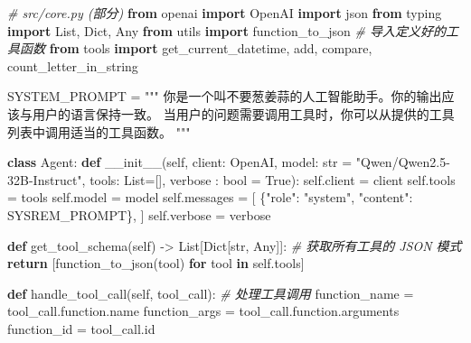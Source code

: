 \documentclass[
]{article}
\newenvironment{Shaded}{}{}
\newcommand{\BuiltInTok}[1]{\textcolor[rgb]{0.00,0.50,0.00}{#1}}
\newcommand{\CommentTok}[1]{\textcolor[rgb]{0.38,0.63,0.69}{\textit{#1}}}
\newcommand{\ControlFlowTok}[1]{\textcolor[rgb]{0.00,0.44,0.13}{\textbf{#1}}}
\newcommand{\FunctionTok}[1]{\textcolor[rgb]{0.02,0.16,0.49}{#1}}
\newcommand{\ImportTok}[1]{\textcolor[rgb]{0.00,0.50,0.00}{\textbf{#1}}}
\newcommand{\KeywordTok}[1]{\textcolor[rgb]{0.00,0.44,0.13}{\textbf{#1}}}
\newcommand{\NormalTok}[1]{#1}
\newcommand{\OperatorTok}[1]{\textcolor[rgb]{0.40,0.40,0.40}{#1}}
\newcommand{\StringTok}[1]{\textcolor[rgb]{0.25,0.44,0.63}{#1}}
\newcommand{\VariableTok}[1]{\textcolor[rgb]{0.10,0.09,0.49}{#1}}
\begin{document}
\begin{Shaded}
\begin{Highlighting}[]
\CommentTok{\# src/core.py (部分)}
\ImportTok{from}\NormalTok{ openai }\ImportTok{import}\NormalTok{ OpenAI}
\ImportTok{import}\NormalTok{ json}
\ImportTok{from}\NormalTok{ typing }\ImportTok{import}\NormalTok{ List, Dict, Any}
\ImportTok{from}\NormalTok{ utils }\ImportTok{import}\NormalTok{ function\_to\_json}
\CommentTok{\# 导入定义好的工具函数}
\ImportTok{from}\NormalTok{ tools }\ImportTok{import}\NormalTok{ get\_current\_datetime, add, compare, count\_letter\_in\_string}

\NormalTok{SYSTEM\_PROMPT }\OperatorTok{=} \StringTok{"""}
\StringTok{你是一个叫不要葱姜蒜的人工智能助手。你的输出应该与用户的语言保持一致。}
\StringTok{当用户的问题需要调用工具时，你可以从提供的工具列表中调用适当的工具函数。}
\StringTok{"""}

\KeywordTok{class}\NormalTok{ Agent:}
    \KeywordTok{def} \FunctionTok{\_\_init\_\_}\NormalTok{(}\VariableTok{self}\NormalTok{, client: OpenAI, model: }\BuiltInTok{str} \OperatorTok{=} \StringTok{"Qwen/Qwen2.5{-}32B{-}Instruct"}\NormalTok{, tools: List}\OperatorTok{=}\NormalTok{[], verbose : }\BuiltInTok{bool} \OperatorTok{=} \VariableTok{True}\NormalTok{):}
        \VariableTok{self}\NormalTok{.client }\OperatorTok{=}\NormalTok{ client}
        \VariableTok{self}\NormalTok{.tools }\OperatorTok{=}\NormalTok{ tools}
        \VariableTok{self}\NormalTok{.model }\OperatorTok{=}\NormalTok{ model}
        \VariableTok{self}\NormalTok{.messages }\OperatorTok{=}\NormalTok{ [}
\NormalTok{            \{}\StringTok{"role"}\NormalTok{: }\StringTok{"system"}\NormalTok{, }\StringTok{"content"}\NormalTok{: SYSREM\_PROMPT\},}
\NormalTok{        ]}
        \VariableTok{self}\NormalTok{.verbose }\OperatorTok{=}\NormalTok{ verbose}

    \KeywordTok{def}\NormalTok{ get\_tool\_schema(}\VariableTok{self}\NormalTok{) }\OperatorTok{{-}\textgreater{}}\NormalTok{ List[Dict[}\BuiltInTok{str}\NormalTok{, Any]]:}
        \CommentTok{\# 获取所有工具的 JSON 模式}
        \ControlFlowTok{return}\NormalTok{ [function\_to\_json(tool) }\ControlFlowTok{for}\NormalTok{ tool }\KeywordTok{in} \VariableTok{self}\NormalTok{.tools]}

    \KeywordTok{def}\NormalTok{ handle\_tool\_call(}\VariableTok{self}\NormalTok{, tool\_call):}
        \CommentTok{\# 处理工具调用}
\NormalTok{        function\_name }\OperatorTok{=}\NormalTok{ tool\_call.function.name}
\NormalTok{        function\_args }\OperatorTok{=}\NormalTok{ tool\_call.function.arguments}
\NormalTok{        function\_id }\OperatorTok{=}\NormalTok{ tool\_call.}\BuiltInTok{id}


\end{Highlighting}
\end{Shaded}
\end{document}
